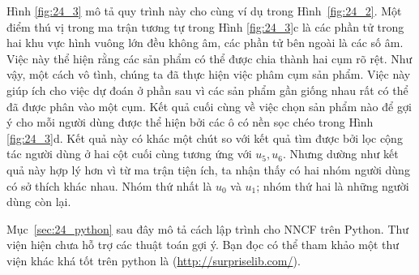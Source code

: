 Hình \ref{fig:24_3} mô tả quy trình này cho cùng ví dụ trong Hình~\ref{fig:24_2}. Một điểm
thú vị trong ma trận tương tự trong Hình \ref{fig:24_3}c là các phần tử trong
hai khu vực hình vuông lớn đều không âm, các phần tử bên ngoài
là các số âm. Việc này thể hiện rằng các sản phẩm có thể được chia thành
hai cụm rõ rệt. Như vậy, một cách {vô tình}, chúng ta đã thực
hiện việc phâm cụm sản phẩm. Việc này giúp ích cho việc dự
đoán ở phần sau vì các sản phẩm gần giống nhau rất có thể đã được phân vào
một cụm.
 Kết quả cuối cùng về việc chọn sản phẩm nào để gợi ý cho mỗi
người dùng được thể hiện bởi các ô có nền sọc chéo trong Hình \ref{fig:24_3}d. Kết quả
này có khác một chút so với kết quả tìm được bởi lọc cộng tác người dùng ở hai cột cuối
cùng tương ứng với $u_5, u_6$. Nhưng dường như kết quả này {hợp lý} hơn vì từ ma trận tiện ích, ta nhận thấy có hai nhóm người dùng có sở thích khác nhau. Nhóm thứ nhất là $u_0$ và $u_1$; nhóm thứ hai là những người dùng còn lại.
 
Mục~\ref{sec:24_python} sau đây mô tả cách lập trình cho NNCF trên
Python. Thư viện  hiện chưa hỗ trợ các thuật toán gợi ý. Bạn đọc có thể tham khảo một thư viện khác khá tốt trên python là  (\url{http://surpriselib.com/}).
 
